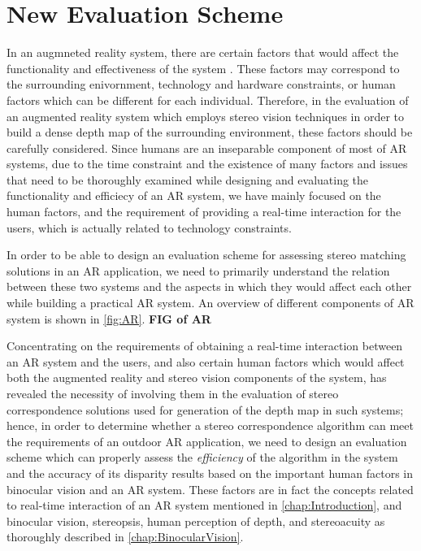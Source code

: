 \section{New Evaluation Scheme}

In an augmneted reality system, there are certain factors that would affect the functionality and effectiveness of the system \cite{dras96,liv05}. These factors may correspond to the surrounding 
enivornment, technology and hardware constraints, or human factors which can be different for each individual. Therefore, in the evaluation of an augmented reality system 
which employs stereo vision techniques in order to build a dense depth map of the surrounding environment, these factors should be carefully considered. 
Since humans are an inseparable component of most of AR systems, due to the time constraint and the existence of many factors and issues that need to be thoroughly 
examined while designing and evaluating the functionality and efficiecy of an AR system, we have mainly focused on the human factors, and the requirement of providing a real-time interaction for
the users, which is actually related to technology constraints. 

In order to be able to design an evaluation scheme for assessing stereo matching solutions in an AR application, we need to primarily understand the relation between these two systems and
the aspects in which they would affect each other while building a practical AR system. An overview of different components of AR system is shown in \ref{fig:AR}.
\textbf{FIG of AR}

Concentrating on the requirements of obtaining a real-time interaction between an AR system and the users, and
also certain human factors which would affect both the augmented reality and stereo vision components of the system,
has revealed the necessity of involving them in the evaluation of stereo correspondence solutions used for generation of the depth map in such systems; hence, in order to 
determine whether a stereo correspondence algorithm can meet the requirements of an outdoor AR application, we need to design an evaluation scheme which can properly assess 
the \textit{efficiency} of the algorithm in the system and the accuracy of its disparity results based on the important human factors in binocular vision and an AR system.
These factors are in fact the concepts related to real-time interaction of an AR system mentioned in \ref{chap:Introduction}, and binocular vision, stereopsis, human perception of depth, 
and stereoacuity as thoroughly described in \ref{chap:BinocularVision}.

